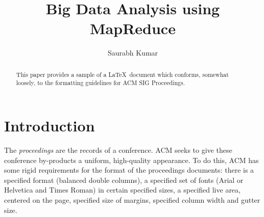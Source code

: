 \documentclass[sigconf]{acmart}
\begin{document}
\title{Big Data Analysis using MapReduce}


\author{Saurabh Kumar}

\renewcommand{\shortauthors}{B. Trovato et al.}


\begin{abstract}
This paper provides a sample of a \LaTeX\ document which conforms,
somewhat loosely, to the formatting guidelines for
ACM SIG Proceedings.
\end{abstract}



\maketitle

\section{Introduction}

The \textit{proceedings} are the records of a
conference. ACM seeks to give these
conference by-products a uniform, high-quality appearance.  To do
this, ACM has some rigid requirements for the format of the
proceedings documents: there is a specified format (balanced double
columns), a specified set of fonts (Arial or Helvetica and Times
Roman) in certain specified sizes, a specified live area, centered on
the page, specified size of margins, specified column width and gutter
size.




 
\end{document}
